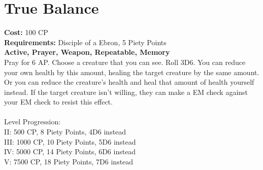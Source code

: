 \section{True Balance}
\textbf{Cost:} 100 CP\\
\textbf{Requirements:} Disciple of a Ebron, 5 Piety Points \\
\textbf{Active, Prayer, Weapon, Repeatable, Memory}\\
Pray for 6 AP. Choose a creature that you can see. Roll 3D6. You can reduce your own health by this amount, healing the target creature by the same amount. Or you can reduce the creature's health and heal that amount of health yourself instead. If the target creature isn't willing, they can make a EM check against your EM check to resist this effect.\\
\\
Level Progression:\\
II: 500 CP, 8 Piety Points, 4D6 instead\\
III: 1000 CP, 10 Piety Points, 5D6 instead\\
IV: 5000 CP, 14 Piety Points, 6D6 instead\\
V: 7500 CP, 18 Piety Points, 7D6 instead\\